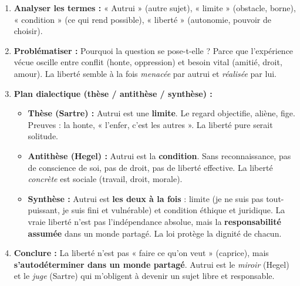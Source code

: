\documentclass[11pt]{article}
\begin{document}
\begin{methode}
\begin{enumerate}
    \item \textbf{Analyser les termes :} « Autrui » (autre sujet), « limite » (obstacle, borne), « condition » (ce qui rend possible), « liberté » (autonomie, pouvoir de choisir).
    \item \textbf{Problématiser :} Pourquoi la question se pose-t-elle ? Parce que l'expérience vécue oscille entre conflit (honte, oppression) et besoin vital (amitié, droit, amour). La liberté semble à la fois \emph{menacée} par autrui et \emph{réalisée} par lui.
    \item \textbf{Plan dialectique (thèse / antithèse / synthèse) :}
    \begin{itemize}
        \item \textbf{Thèse (Sartre) :} Autrui est une \textbf{limite}. Le regard objectifie, aliène, fige. Preuves : la honte, « l'enfer, c'est les autres ». La liberté pure serait solitude.
        \item \textbf{Antithèse (Hegel) :} Autrui est la \textbf{condition}. Sans reconnaissance, pas de conscience de soi, pas de droit, pas de liberté effective. La liberté \emph{concrète} est sociale (travail, droit, morale).
        \item \textbf{Synthèse :} Autrui est \textbf{les deux à la fois} : limite (je ne suis pas tout-puissant, je suis fini et vulnérable) et condition éthique et juridique. La vraie liberté n'est pas l'indépendance absolue, mais la \textbf{responsabilité assumée} dans un monde partagé. La loi protège la dignité de chacun.
    \end{itemize}
    \item \textbf{Conclure :} La liberté n'est pas « faire ce qu'on veut » (caprice), mais \textbf{s'autodéterminer dans un monde partagé}. Autrui est le \emph{miroir} (Hegel) et le \emph{juge} (Sartre) qui m'obligent à devenir un sujet libre et responsable.
\end{enumerate}
\end{methode}
\end{document}
